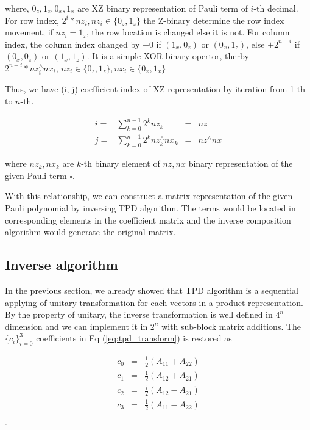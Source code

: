 \documentclass[twocolumn]{article}
\begin{document}
where, $0_z, 1_z, 0_x, 1_x$ are XZ binary representation of Pauli term of $i$-th decimal.
For row index, $2^{i} * nz_i, nz_i\in \{0_z, 1_z\}$ the Z-binary determine
the row index movement, if $nz_i = 1_z$, the row location is changed else it is not.
For column index, the column index changed by $+0$ if $(1_x, 0_z)$ or $(0_x, 1_z)$, 
else $+2^{n-i}$ if $(0_x, 0_z)$ or $(1_x, 1_z)$.
It is a simple XOR binary opertor, therby 
$2^{n-i} * nz_i^{\wedge}nx_i, \, nz_i\in \{0_z, 1_z\}, nx_i \in \{0_x, 1_x\}$

Thus, we have (i, j) coefficient index of XZ representation by iteration from 1-th to $n$-th. 

\begin{equation}
    \begin{array}{clcc}
    i =& \sum_{k=0}^{n-1} 2^{k} nz_k &=& nz\\
    j =& \sum_{k=0}^{n-1} 2^{k} nz_k^{\wedge} nx_k &=& nz^{\wedge}nx
    \end{array}
\end{equation}

where $nz_k, nx_k$ are $k$-th binary element of $nz, nx$ binary representation of the given Pauli term $\square$.

With this relationship, we can construct a matrix representation of the given Pauli polynomial
by inversing TPD algorithm. 
The terms would be located in corresponding elements in 
the coefficient matrix and the inverse composition algorithm would generate the original matrix.

\subsection{Inverse algorithm}

In the previous section, we already showed that TPD algorithm is a sequential 
applying of unitary transformation for each vectors in a product representation.
By the property of unitary, the inverse transformation is well defined 
in $4^n$ dimension and we can implement it in $2^n$ with 
sub-block matrix additions. 
The $\{c_i\}_{i=0}^3$ coefficients in Eq (\ref{eq:tpd_transform}) is restored as 

\begin{equation}
    \label{eq:restore}
    \begin{array}{ccc}
        c_0 &=& \frac{1}{2} (A_{11} + A_{22})\\
        c_1 &=& \frac{1}{2} (A_{12} + A_{21})\\
        c_2 &=& \frac{i}{2} (A_{12} - A_{21})\\
        c_3 &=& \frac{1}{2} (A_{11} - A_{22})\\
    \end{array}
\end{equation}.
\end{document}
